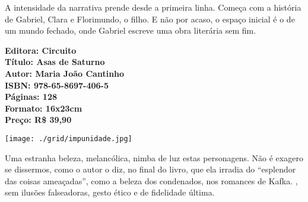 \hspace*{-7cm}\hrulefill\hspace*{-7cm}

\medskip

\noindent{}A intensidade da narrativa prende desde a primeira linha.  Começa com a história de Gabriel, Clara e Florimundo, o filho. E não por acaso, o espaço inicial é o de um mundo fechado, onde Gabriel escreve uma obra literária sem fim.

\vfill

\hspace*{-.4cm}\begin{minipage}[c]{1\linewidth}
\small\textbf{
\hspace*{-.1cm}Editora: Circuito\\
Título: Asas de Saturno\\
Autor: Maria João Cantinho\\ 
ISBN: 978-65-8697-406-5\\
Páginas: 128\\
Formato: 16x23cm\\
Preço: R\$ 39,90\\
}
\end{minipage}

\pagebreak %

\begin{center}
\hspace*{-3.6cm}
\hspace*{3.1cm}\texttt{[image: ./grid/impunidade.jpg]}
\end{center}

\hspace*{-7cm}\hrulefill\hspace*{-7cm}

\medskip

\noindent{}Uma estranha beleza, melancólica, nimba de luz estas personagens. Não é exagero se dissermos, como o autor o diz, no final do livro, que ela irradia do “esplendor das coisas ameaçadas”, como a beleza dos condenados, nos romances de Kafka. , sem ilusões falseadoras, gesto ético e de fidelidade última.

\vfill

